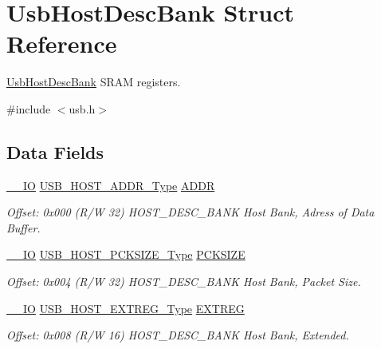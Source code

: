 \hypertarget{struct_usb_host_desc_bank}{}\section{Usb\+Host\+Desc\+Bank Struct Reference}
\label{struct_usb_host_desc_bank}


\mbox{\hyperlink{struct_usb_host_desc_bank}{Usb\+Host\+Desc\+Bank}} S\+R\+AM registers.  




{\ttfamily \#include $<$usb.\+h$>$}

\subsection*{Data Fields}
\begin{DoxyCompactItemize}
\item 
\mbox{\hyperlink{core__cm0plus_8h_aec43007d9998a0a0e01faede4133d6be}{\+\_\+\+\_\+\+IO}} \mbox{\hyperlink{union_u_s_b___h_o_s_t___a_d_d_r___type}{U\+S\+B\+\_\+\+H\+O\+S\+T\+\_\+\+A\+D\+D\+R\+\_\+\+Type}} \mbox{\hyperlink{struct_usb_host_desc_bank_a6ab1cf26c24ddf3b4ba2535a30766035}{A\+D\+DR}}
\begin{DoxyCompactList}\small\item\em Offset\+: 0x000 (R/W 32) H\+O\+S\+T\+\_\+\+D\+E\+S\+C\+\_\+\+B\+A\+NK Host Bank, Adress of Data Buffer. \end{DoxyCompactList}\item 
\mbox{\hyperlink{core__cm0plus_8h_aec43007d9998a0a0e01faede4133d6be}{\+\_\+\+\_\+\+IO}} \mbox{\hyperlink{union_u_s_b___h_o_s_t___p_c_k_s_i_z_e___type}{U\+S\+B\+\_\+\+H\+O\+S\+T\+\_\+\+P\+C\+K\+S\+I\+Z\+E\+\_\+\+Type}} \mbox{\hyperlink{struct_usb_host_desc_bank_a76a4477b8593fe7dec55b33ad17d3a72}{P\+C\+K\+S\+I\+ZE}}
\begin{DoxyCompactList}\small\item\em Offset\+: 0x004 (R/W 32) H\+O\+S\+T\+\_\+\+D\+E\+S\+C\+\_\+\+B\+A\+NK Host Bank, Packet Size. \end{DoxyCompactList}\item 
\mbox{\hyperlink{core__cm0plus_8h_aec43007d9998a0a0e01faede4133d6be}{\+\_\+\+\_\+\+IO}} \mbox{\hyperlink{union_u_s_b___h_o_s_t___e_x_t_r_e_g___type}{U\+S\+B\+\_\+\+H\+O\+S\+T\+\_\+\+E\+X\+T\+R\+E\+G\+\_\+\+Type}} \mbox{\hyperlink{struct_usb_host_desc_bank_ac7bddd966561e14ba17477ab1eeaaff3}{E\+X\+T\+R\+EG}}
\begin{DoxyCompactList}\small\item\em Offset\+: 0x008 (R/W 16) H\+O\+S\+T\+\_\+\+D\+E\+S\+C\+\_\+\+B\+A\+NK Host Bank, Extended. \end{DoxyCompactList}\item 

\end{DoxyCompactItemize}
